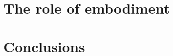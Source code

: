 \documentclass[a4]{epirob}
\begin{document}






\section{The role of embodiment}




%



%






\section{Conclusions}





%




\nocite{natale05developmental}
\nocite{arsenio05exploiting}
\fi







\end{document}
